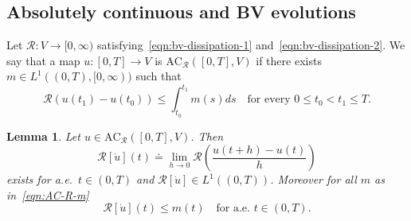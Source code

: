 \documentclass[letterpaper,oneside]{amsart}
\numberwithin{equation}{section}
\newtheorem{lemma}[theorem]{Lemma}
\theoremstyle{definition}
\begin{document}
\subsection{Absolutely continuous and BV evolutions}

Let $\mathcal{R}\colon V\to[0,\infty)$ satisfying~\eqref{eqn:bv-dissipation-1} and~\eqref{eqn:bv-dissipation-2}. We say that a map $u\colon[0,T]\to V$ is $\text{AC}_\mathcal{R}([0,T],V)$ if there exists $m\in L^1((0,T),[0,\infty))$ such that
\begin{equation}
\label{eqn:AC-R-m}
\mathcal{R}(u(t_1)-u(t_0))\le\int_{t_0}^{t_1}m(s)ds\quad\text{for every $0\le t_0<t_1\le T$}.
\end{equation}
\begin{lemma}
Let $u\in\text{AC}_\mathcal{R}([0,T],V)$. Then
\begin{equation*}
\mathcal{R}[\dot u](t)\doteq\lim_{h\to0}\mathcal{R}\left(\frac{u(t+h)-u(t)}{h}\right)
\end{equation*}
exists for a.e.\ $t\in(0,T)$ and $\mathcal{R}[\dot u]\in L^1((0,T))$. Moreover for all $m$ as in~\eqref{eqn:AC-R-m}
\begin{equation*}
\mathcal{R}[\dot u](t)\le m(t)\quad\text{for a.e.\ $t\in(0,T)$}.
\end{equation*}
\end{lemma}
\end{document}
